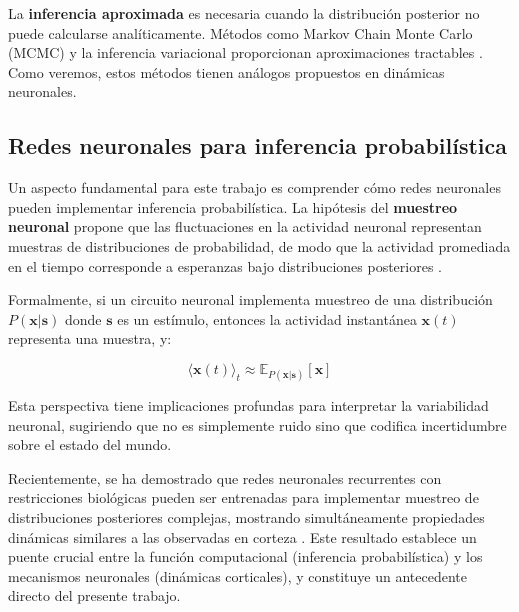 La \textbf{inferencia aproximada} es necesaria cuando la distribución posterior 
no puede calcularse analíticamente. Métodos como Markov Chain Monte Carlo (MCMC) 
y la inferencia variacional proporcionan aproximaciones tractables 
\citep{heaton2018ian}. Como veremos, estos métodos tienen análogos propuestos 
en dinámicas neuronales.

\subsection{Redes neuronales para inferencia probabilística}
\label{subsec:redes_inferencia}

Un aspecto fundamental para este trabajo es comprender cómo redes neuronales pueden implementar inferencia probabilística. La hipótesis del \textbf{muestreo neuronal} propone que las fluctuaciones en la actividad neuronal representan muestras de 
distribuciones de probabilidad, de modo que la actividad promediada en el tiempo corresponde a esperanzas bajo distribuciones posteriores \citep{echeveste2020cortical}.

Formalmente, si un circuito neuronal implementa muestreo de una distribución $P(\mathbf{x}|\mathbf{s})$ donde $\mathbf{s}$ es un estímulo, entonces la actividad instantánea $\mathbf{x}(t)$ representa una muestra, y:

\begin{equation}
\langle \mathbf{x}(t) \rangle_t \approx \mathbb{E}_{P(\mathbf{x}|\mathbf{s})}[\mathbf{x}]
\label{eq:neural_sampling}
\end{equation}

Esta perspectiva tiene implicaciones profundas para interpretar la variabilidad neuronal, sugiriendo que no es simplemente ruido sino que codifica incertidumbre sobre el estado del mundo.

Recientemente, se ha demostrado que redes neuronales recurrentes con restricciones biológicas pueden ser entrenadas para implementar muestreo de distribuciones posteriores complejas, mostrando simultáneamente propiedades dinámicas similares a las observadas en corteza \citep{echeveste2020cortical}. Este resultado establece un puente crucial entre la función computacional (inferencia probabilística) y los mecanismos neuronales (dinámicas corticales), y constituye un antecedente directo del presente trabajo.


